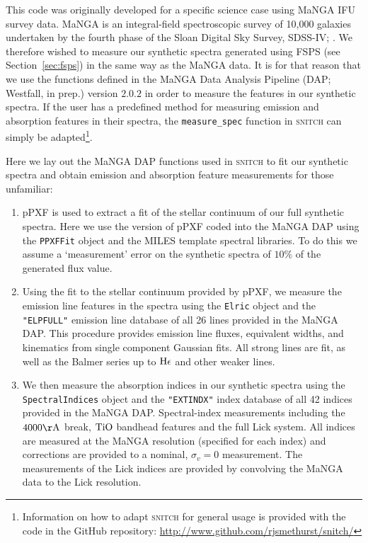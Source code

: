 \documentclass[useAMS,usenatbib]{mn2e}
\begin{document}
This code was originally developed for a specific science case using MaNGA IFU survey data. MaNGA \citep{bundy15} is an integral-field spectroscopic survey of 10,000 galaxies undertaken by the fourth phase of the Sloan Digital Sky Survey, SDSS-IV; \cite{blanton17}. We therefore wished to measure our synthetic spectra generated using FSPS (see Section~\ref{sec:fsps}) in the same way as the MaNGA data. It is for that reason that we use the functions defined in the MaNGA Data Analysis Pipeline (DAP; Westfall, in prep.) version $2.0.2$ in order to measure the features in our synthetic spectra. If the user has a predefined method for measuring emission and absorption features in their spectra, the \texttt{measure\_spec} function in \textsc{snitch} can simply be adapted\footnote{Information on how to adapt \textsc{snitch} for general usage is provided with the code in the GitHub repository: \url{http://www.github.com/rjsmethurst/snitch/}}.

Here we lay out the MaNGA DAP functions used in \textsc{snitch} to fit our synthetic spectra and obtain emission and absorption feature measurements for those unfamiliar:

\begin{enumerate}
\item pPXF \citep{cappellari04} is used to extract a fit of the stellar continuum of our full synthetic spectra. Here we use the version of pPXF coded into the MaNGA DAP using the \texttt{PPXFFit} object and the MILES template spectral libraries. To do this we assume a `measurement' error on the synthetic spectra of $10\%$ of the generated flux value. 
\item Using the fit to the stellar continuum provided by pPXF, we measure the emission line features in the spectra using the \texttt{Elric} object and the \texttt{"ELPFULL"} emission line database of all 26 lines provided in the MaNGA DAP. This procedure provides emission line fluxes, equivalent widths, and kinematics from single component Gaussian fits. All strong lines are fit, as well as the Balmer series up to $\rm{H}\epsilon$ and other weaker lines. 
\item We then measure the absorption indices in our synthetic spectra using the \texttt{SpectralIndices} object and the \texttt{"EXTINDX"} index database of all 42 indices provided in the MaNGA DAP. Spectral-index measurements including the $4000\rm{\AA}$ break, $\rm{TiO}$ bandhead features and the full Lick system. All indices are measured at the MaNGA resolution (specified for each index) and corrections are provided to a nominal, $\sigma_v = 0$ measurement. The measurements of the Lick indices are provided by convolving the MaNGA data to the Lick resolution. 
\end{enumerate}
\end{document}
